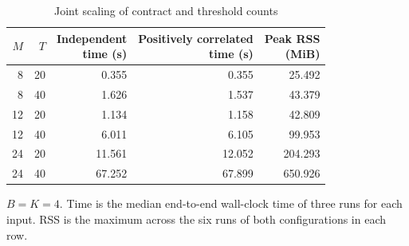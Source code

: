 \begin{table}[tb]
\centering
\caption{Joint scaling of contract and threshold counts}
\label{tab:joint-scale}
\small
\setlength{\tabcolsep}{3.5pt}
\renewcommand{\arraystretch}{1.1}
\begin{tabular*}{\columnwidth}{@{\extracolsep{\fill}}rrrrr@{}}
\toprule
$M$ & $T$ & \shortstack{Independent\\time (s)} &
\shortstack{Positively correlated\\time (s)} & \shortstack{Peak RSS\\(MiB)} \\
\midrule
8  & 20 & 0.355  & 0.355  & 25.492 \\
8  & 40 & 1.626  & 1.537  & 43.379 \\
12 & 20 & 1.134  & 1.158  & 42.809 \\
12 & 40 & 6.011  & 6.105  & 99.953 \\
24 & 20 & 11.561 & 12.052 & 204.293 \\
24 & 40 & 67.252 & 67.899 & 650.926 \\
\bottomrule
\end{tabular*}
\par\vspace{2pt}
\begin{minipage}{\columnwidth}
\footnotesize
$B=K=4$. Time is the median end-to-end wall-clock time of
three runs for each input.
RSS is the maximum across the six runs of both configurations
in each row.
\end{minipage}
\end{table}
